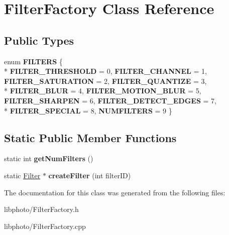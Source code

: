 \hypertarget{classFilterFactory}{\section{Filter\-Factory Class Reference}
\label{classFilterFactory}
}
\subsection*{Public Types}
\begin{DoxyCompactItemize}
\item 
enum {\bfseries F\-I\-L\-T\-E\-R\-S} \{ \\*
{\bfseries F\-I\-L\-T\-E\-R\-\_\-\-T\-H\-R\-E\-S\-H\-O\-L\-D} = 0, 
{\bfseries F\-I\-L\-T\-E\-R\-\_\-\-C\-H\-A\-N\-N\-E\-L} = 1, 
{\bfseries F\-I\-L\-T\-E\-R\-\_\-\-S\-A\-T\-U\-R\-A\-T\-I\-O\-N} = 2, 
{\bfseries F\-I\-L\-T\-E\-R\-\_\-\-Q\-U\-A\-N\-T\-I\-Z\-E} = 3, 
\\*
{\bfseries F\-I\-L\-T\-E\-R\-\_\-\-B\-L\-U\-R} = 4, 
{\bfseries F\-I\-L\-T\-E\-R\-\_\-\-M\-O\-T\-I\-O\-N\-\_\-\-B\-L\-U\-R} = 5, 
{\bfseries F\-I\-L\-T\-E\-R\-\_\-\-S\-H\-A\-R\-P\-E\-N} = 6, 
{\bfseries F\-I\-L\-T\-E\-R\-\_\-\-D\-E\-T\-E\-C\-T\-\_\-\-E\-D\-G\-E\-S} = 7, 
\\*
{\bfseries F\-I\-L\-T\-E\-R\-\_\-\-S\-P\-E\-C\-I\-A\-L} = 8, 
{\bfseries N\-U\-M\-F\-I\-L\-T\-E\-R\-S} = 9
 \}
\end{DoxyCompactItemize}
\subsection*{Static Public Member Functions}
\begin{DoxyCompactItemize}
\item 
\hypertarget{classFilterFactory_a978466237a3acfbd5570fbf1d4dc1080}{static int {\bfseries get\-Num\-Filters} ()}\label{classFilterFactory_a978466237a3acfbd5570fbf1d4dc1080}

\item 
\hypertarget{classFilterFactory_afa9986fc11ea262c26febc9191a19f47}{static \hyperlink{classFilter}{Filter} $\ast$ {\bfseries create\-Filter} (int filter\-I\-D)}\label{classFilterFactory_afa9986fc11ea262c26febc9191a19f47}

\end{DoxyCompactItemize}


The documentation for this class was generated from the following files\-:\begin{DoxyCompactItemize}
\item 
libphoto/Filter\-Factory.\-h\item 
libphoto/Filter\-Factory.\-cpp\end{DoxyCompactItemize}
